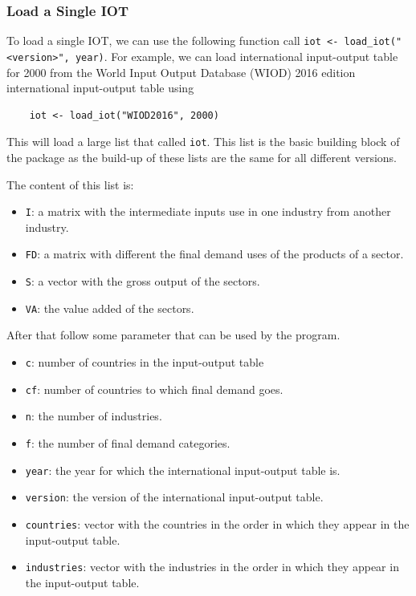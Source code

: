 \documentclass[10pt,a4paper]{paper}
\begin{document}
	\subsubsection{Load a Single IOT}
	\label{subsec:loadsingleiot}
	To load a single IOT, we can use the following function call \texttt{iot <- load\_iot("<version>", year)}.  For example, we can load international input-output table for 2000 from the World Input Output Database (WIOD) 2016 edition international input-output table using
	\begin{Verbatim}
	iot <- load_iot("WIOD2016", 2000)
	\end{Verbatim}
	
	This will load a large list that called \texttt{iot}. This list is the basic building block of the package as the build-up of these lists are the same for all different versions.
	
	The content of this list is:
	\begin{itemize}
		\item \texttt{I}: a matrix with the intermediate inputs use in one industry from another industry.
		\item \texttt{FD}: a matrix with different the final demand uses of the products of a sector. 
		\item \texttt{S}: a vector with the gross output of the sectors.
		\item \texttt{VA}: the value added of the sectors.
	\end{itemize}	
	
	After that follow some parameter that can be used by the program.
	\begin{itemize}
		\item \texttt{c}: number of countries in the input-output table
		\item \texttt{cf}: number of countries to which final demand goes.
		\item \texttt{n}: the number of industries. 
		\item \texttt{f}: the number of final demand categories. 
		\item \texttt{year}: the year for which the international input-output table is.
		\item \texttt{version}: the version of the international input-output table.
		\item \texttt{countries}: vector with the countries in the order in which they appear in the input-output table.
		\item \texttt{industries}: vector with the industries in the order in which they appear in the input-output table.
	\end{itemize}
	
\end{document}
